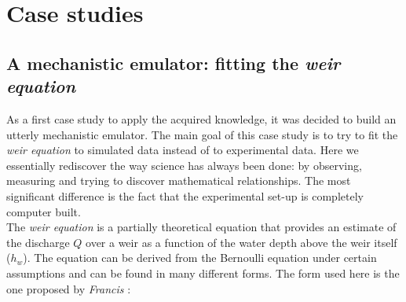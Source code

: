 \chapter{Case studies}
\label{chp:case_studies}

\section{A mechanistic emulator: fitting the \emph{weir equation}}
\label{sec:mechanistic_emulator}


As a first case study to apply the acquired knowledge, it was decided to build an utterly mechanistic emulator.
The main goal of this case study is to try to fit the \emph{weir equation} to simulated data instead of to experimental data.
Here we essentially rediscover the way science has always been done: by observing, measuring and trying to discover mathematical relationships.
The most significant difference is the fact that the experimental set-up is completely computer built.\\

The \emph{weir equation} is a partially theoretical equation that provides an estimate of the discharge $Q$ over a weir as a function of the water depth above the weir itself ($h_w$).
The equation can be derived from the Bernoulli equation under certain assumptions \autocite{bos_discharge_1989} and can be found in many different forms.
The form used here is the one proposed by \emph{Francis} \autocite{walcott_weir_1907}:

